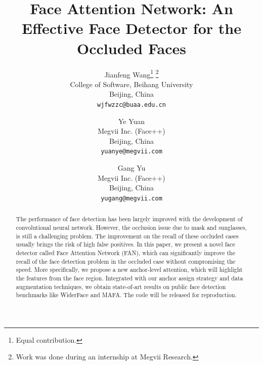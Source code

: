 \documentclass[10pt,twocolumn,letterpaper]{article}
\begin{document}
\title{Face Attention Network: An Effective Face Detector for the Occluded Faces}



\author{
Jianfeng Wang\thanks{Equal contribution.} \thanks{Work was done during an internship at Megvii Research.}\\
College of Software, Beihang University\\
Beijing, China\\
{\tt\small wjfwzzc@buaa.edu.cn}
\and
Ye Yuan\footnotemark[1]\\
Megvii Inc. (Face++)\\
Beijing, China\\
{\tt\small yuanye@megvii.com}
\and
Gang Yu\\
Megvii Inc. (Face++)\\
Beijing, China\\
{\tt\small yugang@megvii.com}
}


\maketitle






\begin{abstract}
The performance of face detection has been largely improved with the development of convolutional neural network. However, the occlusion issue due to mask and sunglasses, is still a challenging problem. The improvement on the recall of these occluded cases usually brings the risk of high false positives. In this paper, we present a novel face detector called Face Attention Network (FAN), which can significantly improve the recall of the face detection problem in the occluded case without compromising the speed. More specifically, we propose a new anchor-level attention, which will highlight the features from the face region. Integrated with our anchor assign strategy and data augmentation techniques, we obtain state-of-art results on public face detection benchmarks like WiderFace and MAFA. The code will be released for reproduction.
\end{abstract}
\end{document}
